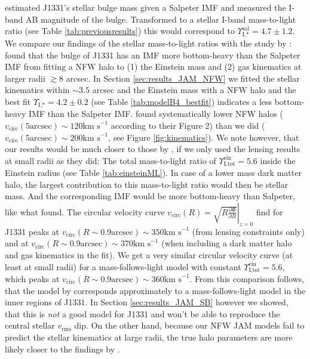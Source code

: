 \citet{SWELLSI} estimated J1331's stellar bulge mass given a Salpeter IMF and measured the I-band AB magnitude of the bulge. Transformed to a stellar I-band mass-to-light ratio (see Table \ref{tab:previousresults}) this would correspond to $\Upsilon_\text{I,*}^\text{sal} = 4.7 \pm 1.2$.\\

We compare our findings of the stellar mass-to-light ratios with the study by \cite{SWELLSV}: \cite{SWELLSV} found that the bulge of J1331 has an IMF more bottom-heavy than the Salpeter IMF from fitting a NFW halo to (1) the Einstein mass and (2) gas kinematics at larger radii $\gtrsim 8$ arcsec. In Section \ref{sec:results_JAM_NFW} we fitted the stellar kinematics within $\sim 3.5$ arcsec and the Einstein mass with a NFW halo and the best fit $\Upsilon_\text{I,*} = 4.2 \pm 0.2$ (see Table \ref{tab:modelB4_bestfit}) indicates a less bottom-heavy IMF than the Salpeter IMF. \cite{SWELLSV}  found systematically lower NFW halos ($v_\text{circ}(5\text{arcsec}) \sim 120 \text{km s}^{-1}$ according to their Figure 2) than we did ($v_\text{circ}(5\text{arcsec}) \sim 200 \text{km s}^{-1}$, see Figure \ref{fig:kinematics}). We note however, that our results would be much closer to those by \citet{SWELLSV}, if we only used the lensing results at small radii as they did: The total mass-to-light ratio of $\Upsilon_\text{I,tot}^\text{ein} = 5.6$ inside the Einstein radius (see Table \ref{tab:einsteinML}). In case of a lower mass dark matter halo, the largest contribution to this mass-to-light ratio would then be stellar mass. And the corresponding IMF would be more bottom-heavy than Salpeter,  like what \citet{SWELLSV} found. The circular velocity curve $v_\text{circ}(R) = \left. \sqrt{R \frac{\partial \Phi}{\partial R}} \right|_{z=0}$ \citet{SWELLSV} find for J1331 peaks at $v_\text{circ}(R\sim0.9 \text{arcsec}) \sim 350 \text{km s}^{-1}$ (from lensing constraints only) and at $v_\text{circ}(R\sim0.9 \text{arcsec}) \sim 370 \text{km s}^{-1}$ (when including a dark matter halo and gas kinematics in the fit). We get a very similar circular velocity curve (at least at small radii) for a mass-follows-light model with constant $\Upsilon_\text{I,tot}^\text{ein} = 5.6$, which peaks at $v_\text{circ}(R\sim0.9 \text{arcsec}) \sim 360 \text{km s}^{-1}$. From this comparison follows, that the model by \citet{SWELLSV} corresponds approximately to a mass-follows-light model in the inner regions of J1331. In Section \ref{sec:results_JAM_SB} however we showed, that this is \emph{not} a good model for J1331 and won't be able to reproduce the central stellar $v_\text{rms}$ dip. On the other hand, because our NFW JAM models fail to predict the stellar kinematics at large radii, the true halo parameters are more likely closer to the findings by \citet{SWELLSV}.\\

